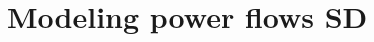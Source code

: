 \documentclass[11pt, a4paper]{article}
\theoremstyle{definition}
\theoremstyle{plain}
\theoremstyle{plain}
\theoremstyle{remark}
\theoremstyle{remark}
\theoremstyle{remark}
\begin{document}
{	%
	
	\section{Modeling power flows SD}
	
}
\end{document}
